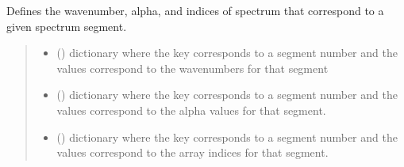 \documentclass[letterpaper,10pt,english]{sphinxmanual}
\begin{document}
\begin{fulllineitems}
\begin{fulllineitems}
\label{\detokenize{MATS:MATS.spectrum.Spectrum.segment_wave_alpha}}
\pysigstartsignatures
{}
\pysigstopsignatures
\sphinxAtStartPar
Defines the wavenumber, alpha, and indices of spectrum that correspond to a given spectrum segment.
\begin{quote}\begin{description}
\sphinxAtStartPar
\begin{itemize}
\item {} 
\sphinxAtStartPar
{} () \textendash{} dictionary where the key corresponds to a segment number and the values correspond to the wavenumbers for that segment

\item {} 
\sphinxAtStartPar
{} () \textendash{} dictionary where the key corresponds to a segment number and the values correspond to the alpha values for that segment.

\item {} 
\sphinxAtStartPar
{} () \textendash{} dictionary where the key corresponds to a segment number and the values correspond to the array indices for that segment.

\end{itemize}


\end{description}\end{quote}

\end{fulllineitems}


\begin{fulllineitems}
\label{\detokenize{MATS:MATS.spectrum.Spectrum.set_Diluent}}
\pysigstartsignatures
{}
\pysigstopsignatures
\end{fulllineitems}



\end{fulllineitems}
\end{document}
